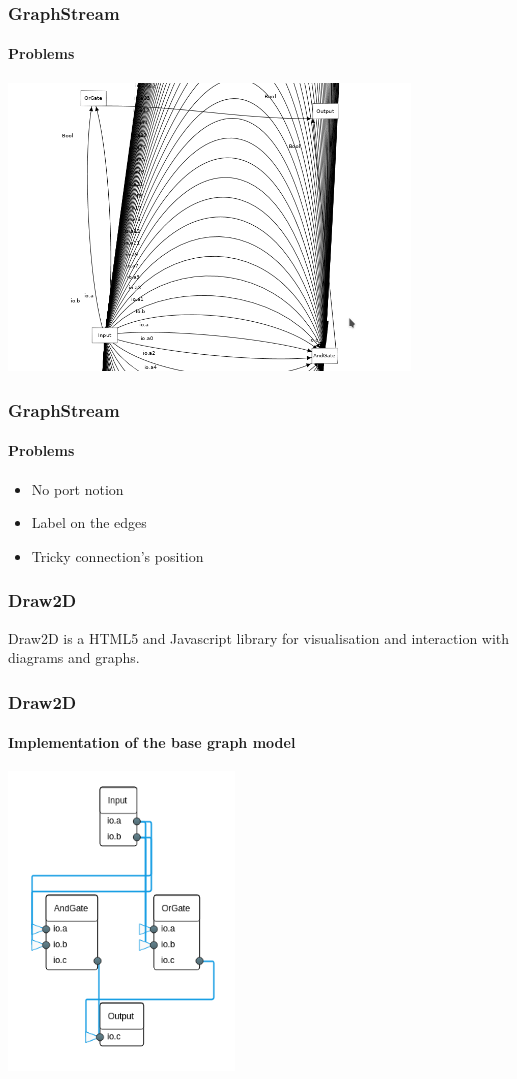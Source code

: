 \documentclass[11pt, handout]{beamer}
\begin{document}
\begin{frame}
  \frametitle{GraphStream}
  \framesubtitle{Problems}
  \begin{center}
    \includegraphics[width=0.8\textwidth]{graphstream_lot_of_edges}
  \end{center}
\end{frame}

\begin{frame}
  \frametitle{GraphStream}
  \framesubtitle{Problems}
  \begin{itemize}
    \item No port notion
    \item Label on the edges
    \item Tricky connection's position
  \end{itemize}
\end{frame}

\begin{frame}
  \frametitle{Draw2D}
  \begin{tcolorbox}
    Draw2D is a HTML5 and Javascript library for visualisation and interaction
    with diagrams and graphs.
  \end{tcolorbox}
\end{frame}

\begin{frame}
  \frametitle{Draw2D}
  \framesubtitle{Implementation of the base graph model}
  \begin{center}
    \includegraphics[width=0.45\textwidth]{draw2d_base_model}
  \end{center}
\end{frame}
\end{document}

